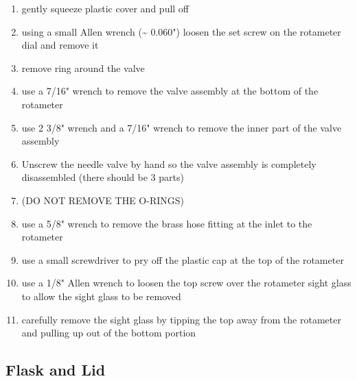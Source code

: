 \begin{enumerate}
\def\labelenumi{\arabic{enumi}.}
\tightlist
\item
  gently squeeze plastic cover and pull off
\item
  using a small Allen wrench (\textasciitilde{} 0.060") loosen the set
  screw on the rotameter dial and remove it
\item
  remove ring around the valve
\item
  use a 7/16" wrench to remove the valve assembly at the bottom of the
  rotameter
\item
  use 2 3/8" wrench and a 7/16" wrench to remove the inner part of the
  valve assembly
\item
  Unscrew the needle valve by hand so the valve assembly is completely
  disassembled (there should be 3 parts)
\item
  (DO NOT REMOVE THE O-RINGS)
\item
  use a 5/8" wrench to remove the brass hose fitting at the inlet to the
  rotameter
\item
  use a small screwdriver to pry off the plastic cap at the top of the
  rotameter
\item
  use a 1/8" Allen wrench to loosen the top screw over the rotameter
  sight glass to allow the sight glass to be removed
\item
  carefully remove the sight glass by tipping the top away from the
  rotameter and pulling up out of the bottom portion
\end{enumerate}

\hypertarget{flask-and-lid}{%
\subsection{Flask and Lid}\label{flask-and-lid}}

